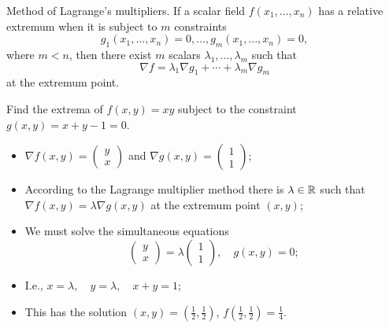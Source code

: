 {Method of Lagrange's multipliers}.
If a scalar field \(f(x_1,\ldots,x_n)\) has a relative extremum when it is subject to \(m\) constraints
\[
    g_1(x_1,\ldots,x_n) = 0,
    \dots , g_m(x_1,\ldots,x_n)=0,
\]
where \(m<n\), then there exist \(m\) scalars \(\lambda_1,\ldots,\lambda_m\) such that
\[
    \nabla f = \lambda_1 \nabla g_1 + \cdots + \lambda_m \nabla g_m
\]
at the extremum point.



\begin{example}
    Find the extrema of \(f(x,y) = xy\) subject to the constraint \(g(x,y) = x+y-1 =0\).
    \begin{itemize}
        \item \(\nabla f(x,y) = \left(\begin{smallmatrix}
                  y\\ x
              \end{smallmatrix}\right)\)
              and \(\nabla g(x,y) = \left(\begin{smallmatrix}
                  1\\ 1
              \end{smallmatrix}\right)\);
        \item  According to the Lagrange multiplier method there is \(\lambda\in \mathbb{R}\) such that \(\nabla f(x,y) = \lambda \nabla g(x,y)\) at the extremum point \((x,y)\);
        \item We must solve the simultaneous equations
              \[
                  \left(\begin{smallmatrix}
                          y\\ x
                      \end{smallmatrix}\right)
                  = \lambda \left(\begin{smallmatrix}
                          1\\ 1
                      \end{smallmatrix}\right),
                  \quad g(x,y) =0;
              \]
        \item I.e.,
              \( x = \lambda, \quad
              y = \lambda, \quad
              x+y = 1;
              \)
        \item This has the solution \((x,y) = (\frac{1}{2},\frac{1}{2})\), \(f(\frac{1}{2},\frac{1}{2})= \frac{1}{4}\).
    \end{itemize}
\end{example}


